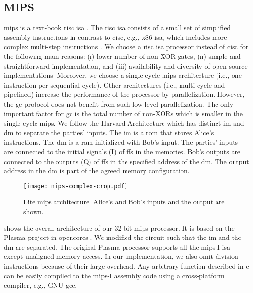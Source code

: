 \subsection{MIPS}\label{ssec:processor-mips}
\gls{mips} is a text-book \acrfull{risc} \acrshort{isa} \cite{kane1992mips}.
The \acrshort{risc} \acrshort{isa} consists of a small set of simplified assembly instructions in contrast to \acrfull{cisc}, e.g., x86 \acrshort{isa}, which includes more complex multi-step instructions \cite{hennessy2012computer}.
We choose a \acrshort{risc} \acrshort{isa} processor instead of \acrshort{cisc} for the following main reasons: (i) lower number of non-XOR gates, (ii) simple and straightforward implementation, and (iii) availability and diversity of open-source implementations.
Moreover, we choose a single-cycle \gls{mips} architecture (i.e., one instruction per sequential cycle).
Other architectures (i.e., multi-cycle and pipelined) increase the performance of the processor by parallelization.
However, the \acrshort{gc} protocol does not benefit from such low-level parallelization.
The only important factor for \acrshort{gc} is the total number of non-XORs which is smaller in the single-cycle \gls{mips}.
We follow the Harvard Architecture which has distinct \acrfull{im} and \acrfull{dm} to separate the parties' inputs.
The \acrshort{im} is a \acrfull{rom} that stores Alice's instructions.
The \acrshort{dm} is a \acrfull{ram} initialized with Bob's input.
The parties' inputs are connected to the initial signals (I) of \acrshort{ff}s in the memories.
Bob's outputs are connected to the outputs (Q) of \acrshort{ff}s in the specified address of the \acrshort{dm}.
The output address in the \acrshort{dm} is part of the agreed memory configuration.

\begin{figure}
\centering
\texttt{[image: mips-complex-crop.pdf]}
\caption{Lite \gls{mips} architecture.
  Alice's and Bob's inputs and the output are shown.}\label{figure:mips}
\end{figure}

 shows the overall architecture of our 32-bit \gls{mips} processor.
It is based on the Plasma project in opencores \cite{rhoads2006plasma}.
We modified the circuit such that the \acrshort{im} and the \acrshort{dm} are separated.
The original Plasma processor supports all the \gls{mips}-I \acrshort{isa} except unaligned memory access.
In our implementation, we also omit division instructions because of their large overhead.
Any arbitrary function described in \gls{c} can be easily compiled to the \gls{mips}-I assembly code using a cross-platform compiler, e.g., GNU gcc.

